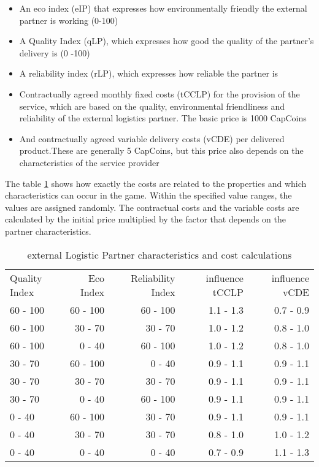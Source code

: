 \begin{itemize}
    \item An eco index (eIP) that expresses how environmentally friendly the external partner is working (0-100)
    \item A Quality Index (qLP), which expresses how good the quality of the partner's delivery is (0 -100)
    \item A reliability index (rLP), which expresses how reliable the partner is
    \item Contractually agreed monthly fixed costs (tCCLP) for the provision of the service, which are based on the quality, environmental friendliness and reliability of the external logistics partner. The basic price is 1000 CapCoins 
    \item And contractually agreed variable delivery costs (vCDE) per delivered product.These are generally 5 CapCoins, but this price also depends on the characteristics of the service provider
\end{itemize}

The table \ref{External_logistic_partner_characteristics} shows how exactly the costs are related to the properties and which characteristics can occur in the game. Within the specified value ranges, the values are assigned randomly. 
The contractual costs and the variable costs are calculated by the initial price multiplied by the factor that depends on the partner characteristics.

\begin{table}[ht]
    \centering
    \begin{tabular}{|l|r|r|r|r|}
    \hline
    Quality Index & Eco Index & Reliability Index & influence tCCLP & influence vCDE \\
    60 - 100      & 60 - 100   & 60 - 100  & 1.1 - 1.3    & 0.7 - 0.9     \\
    60 - 100      & 30 - 70    & 30 - 70   & 1.0 - 1.2    & 0.8 - 1.0     \\
    60 - 100      & 0 - 40     & 60 - 100  & 1.0 - 1.2    & 0.8 - 1.0     \\
    30 - 70       & 60 - 100   & 0 - 40    & 0.9 - 1.1    & 0.9 - 1.1     \\
    30 - 70       & 30 - 70    & 30 - 70   & 0.9 - 1.1    & 0.9 - 1.1     \\
    30 - 70       & 0 - 40     & 60 - 100  & 0.9 - 1.1    & 0.9 - 1.1     \\
    0 - 40        & 60 - 100   & 30 - 70   & 0.9 - 1.1    & 0.9 - 1.1     \\
    0 - 40        & 30 - 70    & 30 - 70   & 0.8 - 1.0    & 1.0 - 1.2     \\
    0 - 40        & 0 - 40     & 0 - 40    & 0.7 - 0.9    & 1.1 - 1.3     \\
    \hline
    \end{tabular}
    \caption{external Logistic Partner characteristics and cost calculations}
    \label{External_logistic_partner_characteristics}
\end{table}


